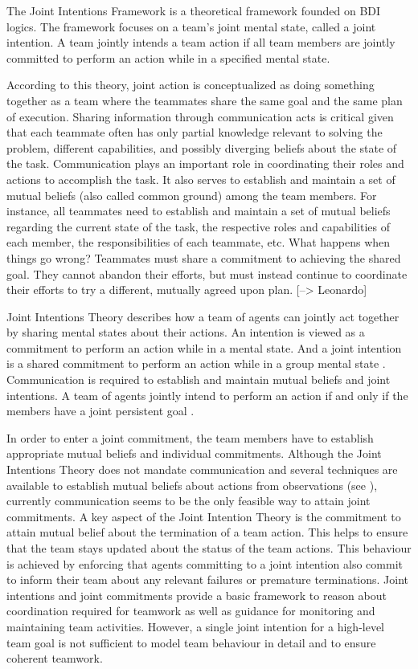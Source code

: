\documentclass[11pt]{article}
\begin{document}
The Joint Intentions Framework \cite{levesque:acting-together}
\cite{cohen:intention-commitment} \cite{cohen:persistence-intention-commitment}
is a theoretical framework founded on BDI logics. The framework focuses on a
team's joint mental state, called a joint intention. A team jointly intends a
team action if all team members are jointly committed to perform an action while
in a specified mental state.

According to this theory, joint action is conceptualized as doing something
together as a team where the teammates share the same goal and the same plan of
execution. Sharing information through communication acts is critical given that
each teammate often has only partial knowledge relevant to solving the problem,
different capabilities, and possibly diverging beliefs about the state of the
task. Communication plays an important role in coordinating their roles and
actions to accomplish the task. It also serves to establish and maintain a set
of mutual beliefs (also called common ground) among the team members. For
instance, all teammates need to establish and maintain a set of mutual beliefs
regarding the current state of the task, the respective roles and capabilities
of each member, the responsibilities of each teammate, etc. What happens when
things go wrong? Teammates must share a commitment to achieving the shared goal.
They cannot abandon their efforts, but must instead continue to coordinate their
efforts to try a different, mutually agreed upon plan. [--> Leonardo]

Joint Intentions Theory describes how a team of agents can jointly act together
by sharing mental states about their actions. An intention is viewed as a
commitment to perform an action while in a mental state. And a joint intention
is a shared commitment to perform an action while in a group mental state
\cite{cohen:intention-commitment}. Communication is required to establish and
maintain mutual beliefs and joint intentions. A team of agents jointly intend to
perform an action if and only if the members have a joint persistent goal
\cite{cohen:teamwork}.

In order to enter a joint commitment, the team members have to establish
appropriate mutual beliefs and individual commitments. Although the Joint
Intentions Theory does not mandate communication and several techniques are
available to establish mutual beliefs about actions from observations (see
\cite{huber:without-communication}), currently communication seems to be the
only feasible way to attain joint commitments. A key aspect of the Joint
Intention Theory is the commitment to attain mutual belief about the termination
of a team action. This helps to ensure that the team stays updated about the
status of the team actions. This behaviour is achieved by enforcing that agents
committing to a joint intention also commit to inform their team about any
relevant failures or premature terminations. Joint intentions and joint
commitments provide a basic framework to reason about coordination required for
teamwork as well as guidance for monitoring and maintaining team activities.
However, a single joint intention for a high-level team goal is not sufficient
to model team behaviour in detail and to ensure coherent teamwork.
\end{document}

